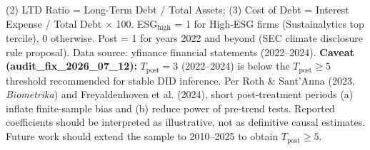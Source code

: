 \begin{table}[htbp]
\begin{threeparttable}
\begin{tablenotes}
    (2) LTD Ratio = Long-Term Debt / Total Assets;
    (3) Cost of Debt = Interest Expense / Total Debt $\times$ 100.
    ESG$_{\text{high}}$ = 1 for High-ESG firms (Sustainalytics top tercile), 0 otherwise.
    Post = 1 for years 2022 and beyond (SEC climate disclosure rule proposal).
    Data source: yfinance financial statements (2022--2024).
    \textbf{Caveat (audit\_fix\_2026\_07\_12):} $T_{\text{post}} = 3$ (2022--2024) is below the
    $T_{\text{post}} \geq 5$ threshold recommended for stable DID inference. Per
    Roth \& Sant'Anna (2023, \textit{Biometrika}) and Freyaldenhoven et al. (2024),
    short post-treatment periods (a) inflate finite-sample bias and (b) reduce
    power of pre-trend tests. Reported coefficients should be interpreted as
    illustrative, not as definitive causal estimates. Future work should
    extend the sample to 2010--2025 to obtain $T_{\text{post}} \geq 5$.
  \end{tablenotes}
  \end{threeparttable}
\end{table}
